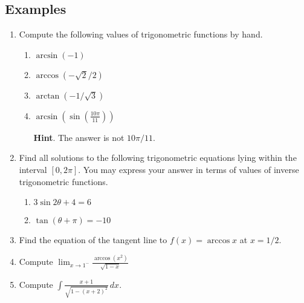 \documentclass[11pt]{article}
\theoremstyle{definition}
\theoremstyle{named}
\numberwithin{myalgctr}{section}
\begin{document}

\subsection*{Examples}

\begin{enumerate}
  \item Compute the following values of trigonometric functions by hand.
  \begin{enumerate}
    \item $\displaystyle\arcsin(-1)$
    \item $\displaystyle\arccos(-\sqrt{2}/2)$
    \item $\displaystyle\arctan(-1/\sqrt{3})$
    \item $\displaystyle\arcsin\left(\sin\left(\frac{10\pi}{11}\right)\right)$

    {\bf Hint}. The answer is not $10\pi/11$.
  \end{enumerate}
  \item Find all solutions to the following trigonometric equations lying within the interval $[0,2\pi]$. You may express your answer in terms of values of inverse trigonometric functions.
  \begin{enumerate}
    \item $\displaystyle 3\sin 2\theta +4=6$
    \item $\displaystyle \tan (\theta+\pi)=-10$
  \end{enumerate}
  \item Find the equation of the tangent line to $f(x)=\arccos x $ at $x=1/2$.

  \item Compute $\displaystyle\lim_{x\rightarrow 1^{-}}\frac{\arccos(x^2)}{\sqrt{1-x}}$

  \item Compute $\displaystyle\int \frac{x+1}{\sqrt{1-(x+2)^2}}\, dx$.
\end{enumerate}
\end{document}
